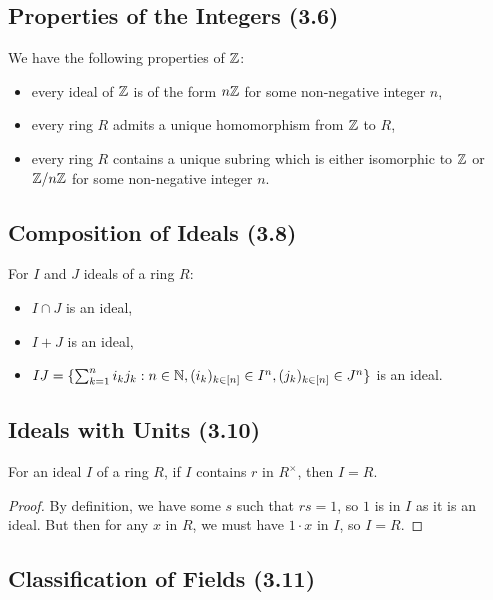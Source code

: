 \subsection{Properties of the Integers (3.6)} \label{3.6}

We have the following properties of $\mathbb{Z}$: \begin{itemize}
    \item every ideal of $\mathbb{Z}$ is of the form $n\mathbb{Z}$ for some
        non-negative integer $n$,
    \item every ring $R$ admits a unique homomorphism from $\mathbb{Z}$
        to $R$,
    \item every ring $R$ contains a unique subring which is either
        isomorphic to $\mathbb{Z}$ or $\mathbb{Z} / n\mathbb{Z}$ for some non-negative
        integer $n$.
\end{itemize}

\subsection{Composition of Ideals (3.8)} \label{3.8}

For $I$ and $J$ ideals of a ring $R$: \begin{itemize}
    \item $I \cap J$ is an ideal,
    \item $I + J$ is an ideal,
    \item $IJ = \{\sum_{k = 1}^n i_kj_k : n \in \mathbb{N},
        (i_k)_{k \in [n]} \in I^n, (j_k)_{k \in [n]} \in J^n\}$ 
        is an ideal.
\end{itemize}

\subsection{Ideals with Units (3.10)} \label{3.10}

For an ideal $I$ of a ring $R$, if $I$ contains $r$ in $R^\times$,
then $I = R$.

\begin{proof}
    By definition, we have some $s$ such that $rs = 1$, so $1$ is in
    $I$ as it is an ideal. But then for any $x$ in $R$, we must have
    $1 \cdot x$ in $I$, so $I = R$.
\end{proof}

\subsection{Classification of Fields (3.11)} \label{3.11}

